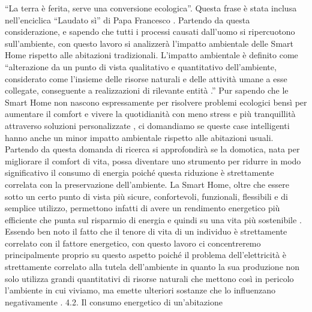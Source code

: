 “La terra è ferita, serve una conversione ecologica”. Questa frase è stata inclusa nell’enciclica “Laudato sì” di Papa Francesco .
Partendo da questa considerazione, e sapendo che tutti i processi causati dall’uomo si ripercuotono sull’ambiente, con questo lavoro si analizzerà l’impatto ambientale delle Smart Home rispetto alle abitazioni tradizionali.
L’impatto ambientale è definito come “alterazione da un punto di vista qualitativo e quantitativo dell’ambiente, considerato come l’insieme delle risorse naturali e delle attività umane a esse collegate, conseguente a realizzazioni di rilevante entità .”
Pur sapendo che le Smart Home non nascono espressamente per risolvere problemi ecologici bensì per aumentare il comfort e vivere la quotidianità con meno stress e più tranquillità attraverso soluzioni personalizzate  , ci domandiamo se queste case intelligenti hanno anche un minor impatto ambientale rispetto alle abitazioni usuali. Partendo da questa domanda di ricerca si approfondirà se la domotica, nata per migliorare il comfort di vita, possa diventare uno strumento per ridurre in modo significativo il consumo di energia poiché questa riduzione è strettamente correlata con la preservazione dell’ambiente. La Smart Home, oltre che essere sotto un certo punto di vista più sicure, confortevoli, funzionali, flessibili e di semplice utilizzo, permettono infatti di avere un rendimento energetico più efficiente che punta sul risparmio di energia e quindi su una vita più sostenibile .
Essendo ben noto il fatto che il tenore di vita di un individuo è strettamente correlato con il fattore energetico, con questo lavoro ci concentreremo principalmente proprio su questo aspetto poiché il problema dell’elettricità è strettamente correlato alla tutela dell’ambiente in quanto la sua produzione non solo utilizza grandi quantitativi di risorse naturali che mettono così in pericolo l’ambiente in cui viviamo, ma emette ulteriori sostanze che lo influenzano negativamente .
4.2.	Il consumo energetico di un’abitazione 
